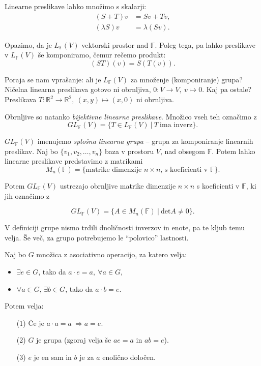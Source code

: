 \ni Linearne preslikave lahko mno\v zimo s skalarji:
\begin{align*}
	(S + T)v &= Sv + Tv, \\
	(\lambda S)v &= \lambda (Sv).
\end{align*}

\ni Opazimo, da je $L_{\mathbb{F}}(V)$ vektorski prostor nad $\mathbb{F}$. Poleg tega, pa lahko preslikave v $L_{\mathbb{F}}(V)$ \v se komponiramo,
\v cemur re\v cemo produkt:
\[
	(ST)(v) = S (T (v)).
\]

\ni Poraja se nam vpra\v sanje: ali je $L_{\mathbb{F}}(V)$ za mno\v zenje (komponiranje) grupa? Ni\v celna linearna preslikava gotovo ni obrnljiva,
$0: V \to V,\ v \mapsto 0$. Kaj pa ostale? Preslikava $T:\mathbb{R}^2 \to \mathbb{R}^2,\ (x,y) \mapsto (x, 0)$ ni obrnljiva.

Obrnljive so natanko \emph{bijektivne linearne preslikave}. Mno\v zico vseh teh ozna\v cimo z
\[
	GL_{\mathbb{F}}(V) = \{T \in L_{\mathbb{F}}(V)\ |\ T\ \text{ima inverz}\}.
\]

$GL_{\mathbb{F}}(V)$ imenujemo \emph{splo\v sna linearna grupa} -- grupa za komponiranje linearnih preslikav. Naj bo $\{v_1, v_2, \ldots, v_n\}$ baza
v prostoru $V$, nad obsegom $\mathbb{F}$. Potem lahko linearne preslikave predstavimo z matrikami
\[
	M_n (\mathbb{F}) = \{\text{matrike dimenzije $n\times n$, s koeficienti v $\mathbb{F}$}\}.
\]

\ni Potem $GL_{\mathbb{F}}(V)$ ustrezajo obrnljive matrike dimenzije $n\times n$ s koeficienti v $\mathbb{F}$, ki jih ozna\v cimo z

\[
	GL_{\mathbb{F}}(V) = \{A \in M_n (\mathbb{F})\ |\ \text{det}A \neq 0\}.
\]

V definiciji grupe nismo trdili dnoli\v cnosti inverzov in enote, pa te kljub temu velja. \v Se ve\v c, za grupo potrebujemo le "`polovico"' lastnosti.

\pagebreak

\begin{trditev}
	Naj bo $G$ mno\v zica z asociativno operacijo, za katero velja:
	\begin{itemize}
		\item{$\exists e \in G$, tako da $a\cdot e = a,\ \forall a \in G$,}
		\item{$\forall a \in G$, $\exists b \in G$, tako da $a\cdot b = e$.}
	\end{itemize}
	\ni Potem velja:
	\begin{itemize}
		\item[(1)]{\v Ce je $a\cdot a = a\ \Rightarrow a = e$.}
		\item[(2)]{$G$ je grupa (zgoraj velja \v se $ae = a$ in $ab = e$).}
		\item[(3)]{$e$ je en sam in $b$ je za $a$ enoli\v cno dolo\v cen.}
	\end{itemize}
\end{trditev}

